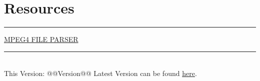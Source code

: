 \section{Resources}
\hrule

\medskip

\href{http://mp4parser.com}{MPEG4 FILE PARSER}
\vfill
\hrule
~\\
This Version: @@Version@@
Latest Version can be found \href{https://github.com/robert-will-brown/video-tech-cheatsheet}{here}.
